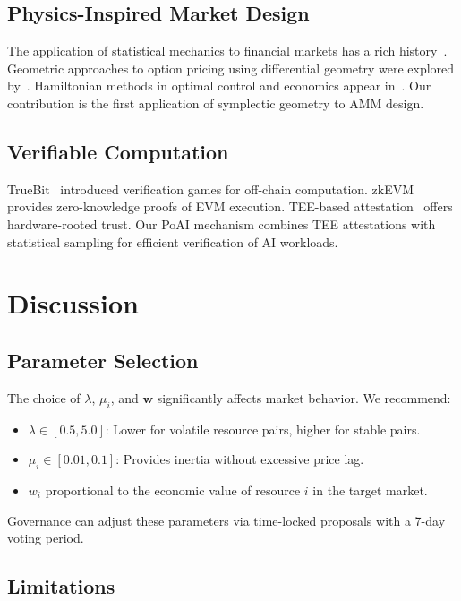 \documentclass[11pt,twocolumn]{article}
\begin{document}
\subsection{Physics-Inspired Market Design}

The application of statistical mechanics to financial markets has a rich history~\cite{mantegna2000introduction,bouchaud2003theory}. Geometric approaches to option pricing using differential geometry were explored by~\cite{ilinski2001physics}. Hamiltonian methods in optimal control and economics appear in~\cite{sethi2019optimal}. Our contribution is the first application of symplectic geometry to AMM design.

\subsection{Verifiable Computation}

TrueBit~\cite{teutsch2019truebit} introduced verification games for off-chain computation. zkEVM~\cite{zkevm2023} provides zero-knowledge proofs of EVM execution. TEE-based attestation~\cite{costan2016intel} offers hardware-rooted trust. Our PoAI mechanism combines TEE attestations with statistical sampling for efficient verification of AI workloads.

\section{Discussion}
\label{sec:discussion}

\subsection{Parameter Selection}

The choice of $\lambda$, $\mu_i$, and $\bm{w}$ significantly affects market behavior. We recommend:
\begin{itemize}[leftmargin=1.1em]
    \item $\lambda \in [0.5, 5.0]$: Lower for volatile resource pairs, higher for stable pairs.
    \item $\mu_i \in [0.01, 0.1]$: Provides inertia without excessive price lag.
    \item $w_i$ proportional to the economic value of resource $i$ in the target market.
\end{itemize}

Governance can adjust these parameters via time-locked proposals with a 7-day voting period.

\subsection{Limitations}
\end{document}
